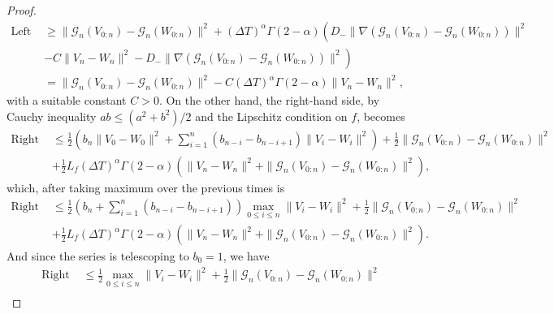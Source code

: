 \documentclass[12pt,a4paper]{article}
\begin{document}
\begin{proof}
\begin{equation}
\begin{split}
			\text{Left } &\geq \|\mathcal{G}_n\left(V_{0:n}\right) - \mathcal{G}_n\left(W_{0:n}\right)\|^2 + \left(\Delta T\right)^\alpha \Gamma(2-\alpha) \left(D_- \|\nabla\left(\mathcal{G}_n\left(V_{0:n}\right) - \mathcal{G}_n\left(W_{0:n}\right)\right)\|^2 \right. \\
			&\left.- C\|V_n - W_n\|^2 - D_-\|\nabla\left(\mathcal{G}_n\left(V_{0:n}\right) - \mathcal{G}_n\left(W_{0:n}\right)\right)\|^2 \right) \\
			&= \|\mathcal{G}_n\left(V_{0:n}\right) - \mathcal{G}_n\left(W_{0:n}\right)\|^2 - C\left(\Delta T\right)^\alpha \Gamma(2-\alpha)\|V_n - W_n\|^2,
		\end{split}
	\end{equation}
	with a suitable constant $C>0$. On the other hand, the right-hand side, by Cauchy inequality $a b \leq (a^2+b^2)/2$ and the Lipschitz condition on $f$, becomes
	\begin{equation}
		\begin{split}
			\text{Right } 
			&\leq \frac{1}{2}\left(b_n \|V_{0}-W_{0}\|^2 + \sum_{i=1}^n \left(b_{n-i} - b_{n-i+1}\right)\|V_{i}-W_{i}\|^2\right) + \frac{1}{2} \|\mathcal{G}_n\left(V_{0:n}\right) - \mathcal{G}_n\left(W_{0:n}\right)\|^2 \\
			&+ \frac{1}{2}L_f \left(\Delta T\right)^\alpha \Gamma(2-\alpha) \left(\|V_n - W_n\|^2 + \|\mathcal{G}_n\left(V_{0:n}\right) - \mathcal{G}_n\left(W_{0:n}\right)\|^2\right),
		\end{split}
	\end{equation}
	which, after taking maximum over the previous times is
	\begin{equation}
		\begin{split}
			\text{Right } 
			&\leq \frac{1}{2}\left(b_n + \sum_{i=1}^n \left(b_{n-i} - b_{n-i+1}\right)\right)\max_{0\leq i \leq n}\|V_{i}-W_{i}\|^2 + \frac{1}{2} \|\mathcal{G}_n\left(V_{0:n}\right) - \mathcal{G}_n\left(W_{0:n}\right)\|^2 \\
			&+ \frac{1}{2}L_f \left(\Delta T\right)^\alpha \Gamma(2-\alpha) \left(\|V_n - W_n\|^2 + \|\mathcal{G}_n\left(V_{0:n}\right) - \mathcal{G}_n\left(W_{0:n}\right)\|^2\right).
		\end{split}
	\end{equation}
	And since the series is telescoping to $b_0 = 1$, we have
	\begin{equation}\label{eqn:LipschitzRight}
		\begin{split}
			\text{Right } 
			&\leq \frac{1}{2}\max_{0\leq i \leq n}\|V_{i}-W_{i}\|^2 + \frac{1}{2} \|\mathcal{G}_n\left(V_{0:n}\right) - \mathcal{G}_n\left(W_{0:n}\right)\|^2 \\

\end{split}
\end{equation}
\end{proof}
\end{document}
